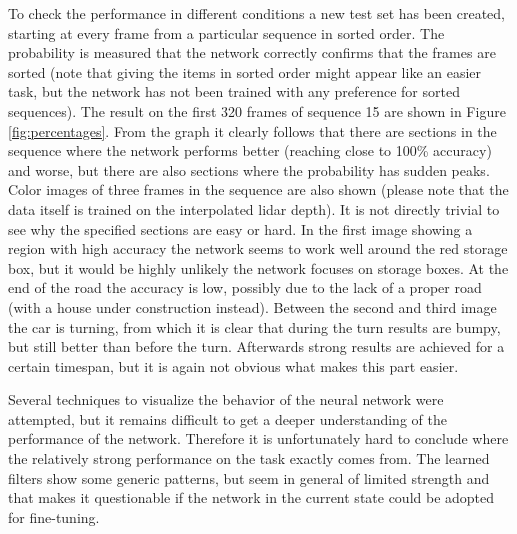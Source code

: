 To check the performance in different conditions a new test set has been created, starting at every frame from a particular sequence in sorted order. The probability is measured that the network correctly confirms that the frames are sorted (note that giving the items in sorted order might appear like an easier task, but the network has not been trained with any preference for sorted sequences). The result on the first 320 frames of sequence 15 are shown in Figure \ref{fig:percentages}. From the graph it clearly follows that there are  sections in the sequence where the network performs better (reaching close to 100\% accuracy) and worse, but there are also sections where the probability has sudden peaks. Color images of three frames in the sequence are also shown (please note that the data itself is trained on the interpolated lidar depth). It is not directly trivial to see why the specified sections are easy or hard. In the first image showing a region with high accuracy the network seems to work well around the red storage box, but it would be highly unlikely the network focuses on storage boxes. At the end of the road the accuracy is low, possibly due to the lack of a proper road (with a house under construction instead). Between the second and third image the car is turning, from which it is clear that during the turn results are bumpy, but still better than before the turn. Afterwards strong results are achieved for a certain timespan, but it is again not obvious what makes this part easier. 

Several techniques to visualize the behavior of the neural network were attempted, but it remains difficult to get a deeper understanding of the performance of the network. Therefore it is unfortunately hard to conclude where the relatively strong performance on the task exactly comes from. The learned filters show some generic patterns, but seem in general of limited strength and that makes it questionable if the network in the current state could be adopted for fine-tuning.


